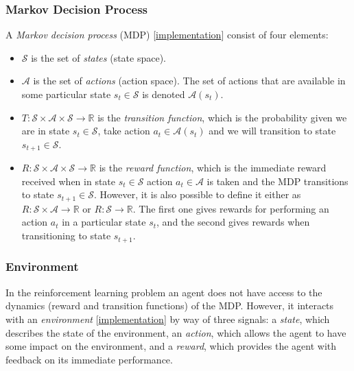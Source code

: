 \documentclass{article}
\newcommand{\GithubURL}[1]{[\href{https://github.com/davidrobles/mlnd-capstone-code/blob/master/#1}{implementation}]}
\begin{document}
\subsubsection{Markov Decision Process}

A \emph{Markov decision process} (MDP) \GithubURL{capstone/rl/mdp.py} consist of four elements:

\begin{itemize}

    \item $\mathcal{S}$ is the set of \emph{states} (state space).

    \item $\mathcal{A}$ is the set of \emph{actions} (action space). The set of actions that are
        available in some particular state $s_t \in \mathcal{S}$ is denoted $\mathcal{A}(s_t)$.

    \item $ T : \mathcal{S} \times \mathcal{A} \times \mathcal{S} \to \mathbb{R}$ is the
      \emph{transition function}, which is the probability given we are in state $s_t \in
      \mathcal{S}$, take action $a_t \in \mathcal{A}(s_t)$ and we will transition to state $s_{t+1}
      \in \mathcal{S}$.

    \item $ R : \mathcal{S} \times \mathcal{A} \times \mathcal{S} \to \mathbb{R}$ is the
      \emph{reward function}, which is the immediate reward received when in state $s_t \in
      \mathcal{S}$ action $a_t \in \mathcal{A}$ is taken and the MDP transitions to state $s_{t+1}
      \in \mathcal{S}$. However, it is also possible to define it either as $ R : \mathcal{S} \times
      \mathcal{A} \to \mathbb{R}$ or $R : \mathcal{S} \to \mathbb{R}$. The first one gives rewards
      for performing an action $a_t$ in a particular state $s_t$, and the second gives rewards when
      transitioning to state $s_{t+1}$.

\end{itemize}

\subsubsection{Environment}

In the reinforcement learning problem an agent does not have access to the dynamics (reward and
transition functions) of the MDP. However, it interacts with an \emph{environment}
\GithubURL{capstone/rl/environment.py} by way of three signals: a \emph{state}, which describes the
state of the environment, an \emph{action}, which allows the agent to have some impact on the
environment, and a \emph{reward}, which provides the agent with feedback on its immediate
performance.
\end{document}

